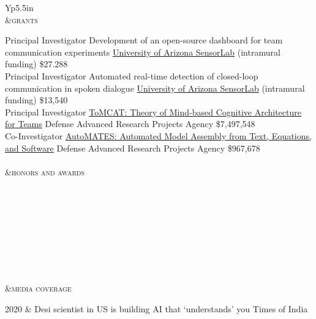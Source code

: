 \documentclass[final,oneside,12pt]{memoir}
\newcommand{\heading}[1]{%
  \\
  &{\Large\textsc{\MakeTextLowercase{#1}}}\\\addlinespace
  \cmidrule{2-2}\addlinespace
}
\begin{document}
\begin{ctabular}{Yp{5.5in}}
  \heading{Grants}
  {Principal Investigator}%
  {Development of an open-source dashboard for team communication experiments}%
  {\href{https://sensorlab.arizona.edu}{University of Arizona SensorLab} (intramural funding)}%
    {\$27.288}\\
  {Principal Investigator}%
  {Automated real-time detection of closed-loop communication in spoken dialogue}%
  {\href{https://sensorlab.arizona.edu}{University of Arizona SensorLab} (intramural funding)}%
    {\$13,540}\\
  {Principal Investigator}%
  {\href{https://ml4ai.github.io/tomcat}{ToMCAT: Theory of Mind-based Cognitive
  Architecture for Teams}}%
  {Defense Advanced Research Projects Agency}%
    {\$7,497,548}\\
  {Co-Investigator}%
  {\href{https://ml4ai.github.io/automates/}{AutoMATES: Automated Model Assembly from Text, Equations, and Software}}
  {Defense Advanced Research Projects Agency}%
    {\$967,678}\\\addlinespace
  \heading{Honors and Awards}
  \\
  \\
  \\
  \\
  \\
  \\
  \\
  \heading{Media Coverage}
  2020 &  
                {Desi scientist in US is building AI that `understands' you}
                {Times of India}\\


\end{ctabular}
\end{document}
